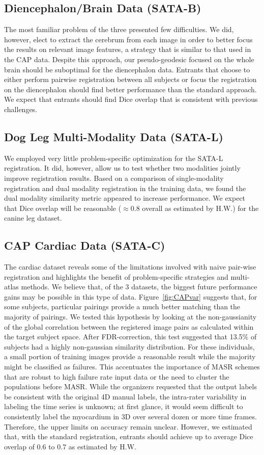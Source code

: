 \documentclass{llncs}
\begin{document}
\subsection{Diencephalon/Brain Data (SATA-B)} The most familiar
problem of the three presented few difficulties.  We did, however,
elect to extract the cerebrum from each image in order to better focus
the results on relevant image features, a strategy that is similar to
that used in the CAP data.  Despite this approach, our pseudo-geodesic
focused on the whole brain should be suboptimal for the diencephalon
data. Entrants that choose to either perform pairwise registration
between all subjects or focus the registration on the diencephalon
should find better performance than the standard approach.  We expect
that entrants should find Dice overlap that is consistent with previous challenges.

\subsection{Dog Leg Multi-Modality Data (SATA-L)}
We employed very little problem-specific optimization for the SATA-L
registration.  It did, however, allow us to test whether two
modalities jointly improve registration results.  Based on a
comparison of single-modality registration and dual modality
registration in the training data, we found the dual modality
similarity metric appeared to increase performance.  We expect that
Dice overlap will be reasonable ($\approx 0.8$ overall as estimated by
H.W.) for the canine leg dataset.

\subsection{CAP Cardiac Data (SATA-C)}
The cardiac dataset reveals some of the limitations involved with
naive pair-wise registration and highlights the benefit of
problem-specific strategies and multi-atlas methods.  We believe that,
of the 3 datasets, the biggest future performance gains may be
possible in this type of data.  Figure~\ref{fig:CAPvar} suggests that,
for some subjects, particular pairings provide a much better matching
than the majority of pairings.  We tested this hypothesis by looking
at the non-gaussianity of the global correlation between the
registered image pairs as calculated within the target subject space.
After FDR-correction, this test suggested that 13.5\% of subjects had
a highly non-gaussian similarity distribution.  For these individuals,
a small portion of training images provide a reasonable result while
the majority might be classified as failures.  This accentuates the
importance of MASR schemes that are robust to high failure rate input
data or the need to cluster the populations before MASR.  While the
organizers requested that the output labels be consistent with the
original 4D manual labels, the intra-rater variability in labeling the
time series is unknown; at first glance, it would seem difficult to
consistently label the myocardium in 3D over several dozen or more
time frames.  Therefore, the upper limits on accuracy remain unclear.
However, we estimated that, with the standard registration, entrants
should achieve up to average Dice overlap of 0.6 to 0.7 as estimated by H.W.  
\end{document}
